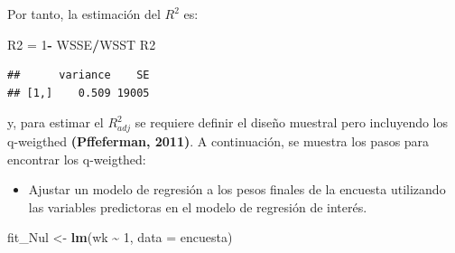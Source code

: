 \documentclass[
  spanish,
  12pt,
]{book}
\newenvironment{Shaded}{\begin{snugshade}}{\end{snugshade}}
\newcommand{\AttributeTok}[1]{\textcolor[rgb]{0.13,0.29,0.53}{#1}}
\newcommand{\DecValTok}[1]{\textcolor[rgb]{0.00,0.00,0.81}{#1}}
\newcommand{\FunctionTok}[1]{\textcolor[rgb]{0.13,0.29,0.53}{\textbf{#1}}}
\newcommand{\NormalTok}[1]{#1}
\newcommand{\OtherTok}[1]{\textcolor[rgb]{0.56,0.35,0.01}{#1}}
\newcommand{\SpecialCharTok}[1]{\textcolor[rgb]{0.81,0.36,0.00}{\textbf{#1}}}
\providecommand{\tightlist}{%
  \setlength{\itemsep}{0pt}\setlength{\parskip}{0pt}}
\begin{document}
\begin{Shaded}
\end{Shaded}

Por tanto, la estimación del \(R^{2}\) es:

\begin{Shaded}
\begin{Highlighting}[]
\NormalTok{R2 }\OtherTok{=} \DecValTok{1}\SpecialCharTok{{-}}\NormalTok{ WSSE}\SpecialCharTok{/}\NormalTok{WSST}
\NormalTok{R2}
\end{Highlighting}
\end{Shaded}

\begin{verbatim}
##      variance    SE
## [1,]    0.509 19005
\end{verbatim}

y, para estimar el \(R_{adj}^{2}\) se requiere definir el diseño muestral pero incluyendo los q-weigthed \textbf{(Pffeferman, 2011)}. A continuación, se muestra los pasos para encontrar los q-weigthed:

\begin{itemize}
\tightlist
\item
  Ajustar un modelo de regresión a los pesos finales de la encuesta utilizando las variables predictoras en el modelo de regresión de interés.
\end{itemize}

\begin{Shaded}
\begin{Highlighting}[]
\NormalTok{fit\_Nul }\OtherTok{\textless{}{-}} \FunctionTok{lm}\NormalTok{(wk }\SpecialCharTok{\textasciitilde{}} \DecValTok{1}\NormalTok{, }\AttributeTok{data =}\NormalTok{ encuesta)}
\end{Highlighting}
\end{Shaded}
\end{document}
